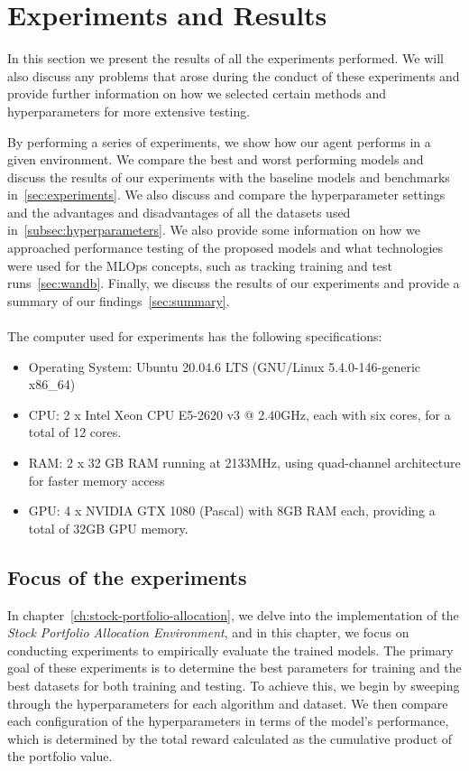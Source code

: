 \documentclass[../xlapes02]{subfiles}
\begin{document}
    \chapter{Experiments and Results}\label{ch:experiments-and-results}
    In this section we present the results of all the experiments performed. We will also discuss any problems that arose during the conduct of these experiments and provide further information on how we selected certain methods and hyperparameters for more extensive testing.

    By performing a series of experiments, we show how our agent performs in a given environment. We compare the best and worst performing models and discuss the results of our experiments with the baseline models and benchmarks in~\cref{sec:experiments}. We also discuss and compare the hyperparameter settings and the advantages and disadvantages of all the datasets used in~\cref{subsec:hyperparameters}. We also provide some information on how we approached performance testing of the proposed models and what technologies were used for the MLOps concepts, such as tracking training and test runs~\cref{sec:wandb}. Finally, we discuss the results of our experiments and provide a summary of our findings~\cref{sec:summary}.
    \\
    \\
    The computer used for experiments has the following specifications:
    \begin{itemize}
        \item Operating System: Ubuntu 20.04.6 LTS (GNU/Linux 5.4.0-146-generic x86\_64)
        \item CPU: 2 x Intel Xeon CPU E5-2620 v3 @ 2.40GHz, each with six cores, for a total of 12 cores.
        \item RAM: 2 x 32 GB RAM running at 2133MHz, using quad-channel architecture for faster memory access
        \item GPU: 4 x NVIDIA GTX 1080 (Pascal) with 8GB RAM each, providing a total of 32GB GPU memory.
    \end{itemize}


    \section{Focus of the experiments}\label{sec:focus-of-the-experiments}
    In chapter~\cref{ch:stock-portfolio-allocation}, we delve into the implementation of the \emph{Stock Portfolio Allocation Environment}, and in this chapter, we focus on conducting experiments to empirically evaluate the trained models. The primary goal of these experiments is to determine the best parameters for training and the best datasets for both training and testing. To achieve this, we begin by sweeping through the hyperparameters for each algorithm and dataset. We then compare each configuration of the hyperparameters in terms of the model's performance, which is determined by the total reward calculated as the cumulative product of the portfolio value.
\end{document}
